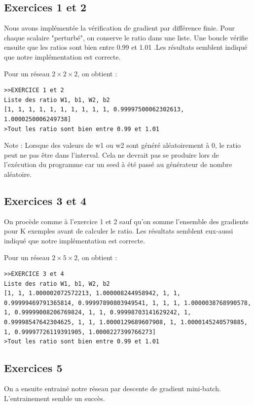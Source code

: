 \documentclass[a4paper,11pt]{article}
\begin{document}
\subsection{Exercices 1 et 2}

Nous avons implémentée la vérification de gradient par différence finie. Pour chaque scalaire "perturbé", on conserve le ratio dans une liste. Une boucle vérifie ensuite que les ratios sont bien entre 0.99 et 1.01 .Les résultats semblent indiqué que notre implémentation est correcte.

Pour un réseau $ 2 \times 2 \times 2 $, on obtient :
\begin{verbatim}
>>EXERCICE 1 et 2
Liste des ratio W1, b1, W2, b2
[1, 1, 1, 1, 1, 1, 1, 1, 1, 1, 0.99997500062302613, 1.0000250006249738]
>Tout les ratio sont bien entre 0.99 et 1.01
\end{verbatim}

Note : Lorsque des valeurs de w1 ou w2 sont généré aléatoirement à 0, le ratio peut ne pas être dans l'interval. Cela ne devrait pas se produire lors de l'exécution du programme car un seed à été passé au générateur de nombre aléatoire.

\subsection{Exercices 3 et 4	}

On procède comme à l'exercice 1 et 2 sauf qu'on somme l'ensemble des gradients pour K exemples avant de calculer le ratio. Les résultats semblent eux-aussi indiqué que notre implémentation est correcte.

Pour un réseau $ 2 \times 5 \times 2 $, on obtient :
\begin{verbatim}
>>EXERCICE 3 et 4
Liste des ratio W1, b1, W2, b2
[1, 1, 1.000002072572213, 1.000008244958942, 1, 1, 0.99999469791365814, 0.99997890803949541, 1, 1, 1, 1.0000038768990578, 1, 0.99999008206769824, 1, 1, 0.99998703141629242, 1, 0.99998547642304625, 1, 1, 1.0000129689607908, 1, 1.0000145240579885, 1, 0.99997726119391905, 1.0000227399766273]
>Tout les ratio sont bien entre 0.99 et 1.01
\end{verbatim}

\subsection{Exercices 5}

On a ensuite entrainé notre réseau par descente de gradient mini-batch.
L'entrainement semble un succès.
\end{document}
